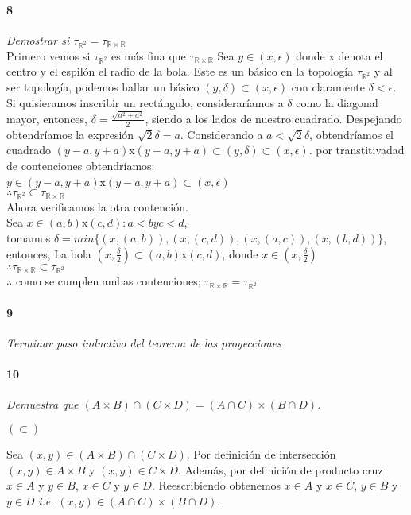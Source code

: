 \documentclass[12pt]{article}
\begin{document}
\paragraph{8}
\textit{Demostrar si $\tau_{\mathbb{R}^2}=\tau_{\mathbb{R} \times \mathbb{R}}$}
\\Primero vemos si \( \tau_{\mathbb{R}^2}\) es más fina que \(\tau_{\mathbb{R} \times \mathbb{R}}\)
Sea \(y\in(x,\epsilon)\) donde x denota el centro y el espilón el radio de la bola. Este es un básico en la topología \( \tau_{\mathbb{R}^2}\) y al ser topología, podemos hallar un básico \((y,\delta)\subset(x,\epsilon)\) con claramente \(\delta<\epsilon\).
\\Si quisieramos inscribir un rectángulo, consideraríamos a \(\delta\) como la diagonal mayor, entonces, \(\delta=\frac{\sqrt{a^2+a^2}}{2}\), siendo a los lados de nuestro cuadrado. Despejando obtendríamos la expresión \(\sqrt{2}\delta=a\). Considerando a \(a<\sqrt{2}\delta\), obtendríamos el cuadrado \((y-a,y+a)\)x\((y-a,y+a)\subset(y,\delta)\subset(x,\epsilon)\). por transtitivadad de contenciones obtendríamos:
\\\(y\in(y-a,y+a)\)x\((y-a,y+a)\subset(x,\epsilon)\)
\\\(\therefore\tau_{\mathbb{R}^2}\subset\tau_{\mathbb{R} \times \mathbb{R}}\)
\\Ahora verificamos la otra contención.
\\Sea \(x\in(a,b)\)x\((c,d): a<b y c<d\),
\\tomamos \(\delta=min\{(x,(a,b)),(x,(c,d)),(x,(a,c)),(x,(b,d))\}\), entonces, La bola \((x,\frac{\delta}{2})\subset(a,b)\)x\((c,d)\), donde \(x\in(x,\frac{\delta}{2})\)
\\\(\therefore\tau_{\mathbb{R} \times \mathbb{R}}\subset\tau_{\mathbb{R}^2}\)
\\\(\therefore\) como se cumplen ambas contenciones; \(\tau_{\mathbb{R} \times \mathbb{R}}=\tau_{\mathbb{R}^2}\)
\paragraph{9}
\textit{Terminar paso inductivo del teorema de las proyecciones}

\paragraph{10}
\textit{Demuestra que $(A \times B) \cap (C \times D)= (A \cap C) \times (B \cap D)$.}

$(\subset)$

Sea $(x,y) \in (A \times B) \cap (C \times D)$. Por definición de intersección $(x,y)\in A\times B$ y $(x,y) \in C\times D$. Además, por definición
de producto cruz $x \in A $ y $y \in B$, $x \in C$ y $y \in D$. Reescribiendo obtenemos $x\in A$ y $x\in C$, $y \in B$ y $y\in D$ \textit{i.e.}  $(x,y) \in (A \cap C)\times (B \cap D)$.
\end{document}
